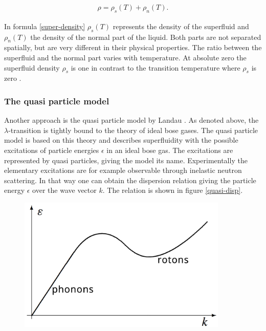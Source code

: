 \documentclass[parskip,12pt,headsepline,a4paper] {scrbook}
\begin{document}
\begin{align}  \label{super-density}
\rho = \rho_s(T) + \rho_n(T) .
\end{align}

In formula \ref{super-density} $\rho_s(T)$ represents the density of the superfluid and $\rho_n(T)$ the density of the normal part of the liquid. Both parts are not separated spatially, but are very different in their physical properties. The ratio between the superfluid and the normal part varies with temperature. At absolute zero the superfluid density $\rho_s$ is one in contrast to the transition temperature where $\rho_s$ is zero \cite{fliessbach}.

\subsubsection{The quasi particle model}
\vspace{-1\baselineskip}
Another approach is the quasi particle model by Landau \cite{landau}. As denoted above, the $\lambda$-transition is tightly bound to the theory of ideal bose gases. The quasi particle model is based on this theory and describes superfluidity with the possible excitations of particle energies $\epsilon$ in an ideal bose gas. The excitations are represented by quasi particles, giving the model its name. Experimentally the elementary excitations are for example observable through inelastic neutron scattering. In that way one can obtain the dispersion relation giving the particle energy $\epsilon$ over the wave vector $k$. The relation is shown in figure \ref{quasi-disp}.

\begin{figure}[ht]
\centerline{
\includegraphics[width=10cm]{./helium/DispRel.jpg}}
\end{figure}
\end{document}
